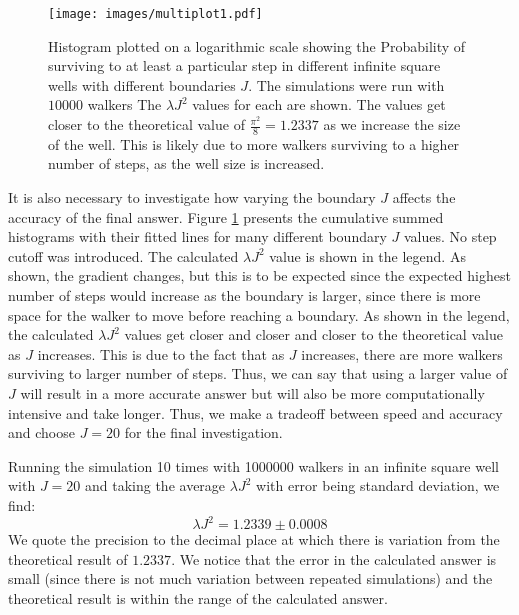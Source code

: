 \documentclass[journal]{IEEEtran}
\begin{document}
\begin{figure}[!ht]
  \begin{center}
    \texttt{[image: images/multiplot1.pdf]}
    \caption{Histogram plotted on a logarithmic scale showing the Probability of
      surviving to at least a particular step in different infinite square wells
      with different boundaries $J$. The simulations were run with $10000$
      walkers The $\lambda J^2$ values for each are shown. The values get closer
      to the theoretical value of $\frac{\pi^2}{8} = 1.2337$ as we increase the
      size of the well. This is likely due to more walkers surviving to a higher
      number of steps, as the well size is increased.}
    \label{fig:multi_line_plot}
  \end{center}
\end{figure}

It is also necessary to investigate how varying the boundary $J$ affects the
accuracy of the final answer. Figure \ref{fig:multi_line_plot} presents the
cumulative summed histograms with their fitted lines for many different boundary
$J$ values. No step cutoff was introduced. The calculated $\lambda J^2$ value is
shown in the legend. As shown, the gradient changes, but this is to be expected
since the expected highest number of steps would increase as the boundary is
larger, since there is more space for the walker to move before reaching a
boundary. As shown in the legend, the calculated $\lambda J^2$ values get closer
and closer and closer to the theoretical value as $J$ increases. This is due to
the fact that as $J$ increases, there are more walkers surviving to larger
number of steps. Thus, we can say that using a larger value of $J$ will result
in a more accurate answer but will also be more computationally intensive and
take longer. Thus, we make a tradeoff between speed and accuracy and choose
$J=20$ for the final investigation.

Running the simulation 10 times with 1000000 walkers in an infinite square well
with $J=20$ and taking the average $\lambda J^2$ with error being standard
deviation, we find:
\begin{equation}
  \lambda J^2 = 1.2339 \pm 0.0008
  \nonumber
\end{equation}
We quote the precision to the decimal place at which there is variation from the
theoretical result of $1.2337$. We notice that the error in the calculated
answer is small (since there is not much variation between repeated simulations)
and the theoretical result is within the range of the calculated answer.
\end{document}

